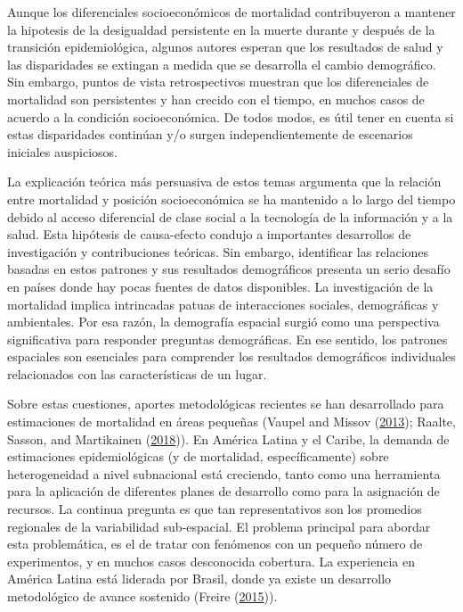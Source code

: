 \documentclass[12pt,]{article}
\begin{document}
Aunque los diferenciales socioeconómicos de mortalidad contribuyeron a
mantener la hipotesis de la desigualdad persistente en la muerte durante
y después de la transición epidemiológica, algunos autores esperan que
los resultados de salud y las disparidades se extingan a medida que se
desarrolla el cambio demográfico. Sin embargo, puntos de vista
retrospectivos muestran que los diferenciales de mortalidad son
persistentes y han crecido con el tiempo, en muchos casos de acuerdo a
la condición socioeconómica. De todos modos, es útil tener en cuenta si
estas disparidades continúan y/o surgen independientemente de escenarios
iniciales auspiciosos.

La explicación teórica más persuasiva de estos temas argumenta que la
relación entre mortalidad y posición socioeconómica se ha mantenido a lo
largo del tiempo debido al acceso diferencial de clase social a la
tecnología de la información y a la salud. Esta hipótesis de
causa-efecto condujo a importantes desarrollos de investigación y
contribuciones teóricas. Sin embargo, identificar las relaciones basadas
en estos patrones y sus resultados demográficos presenta un serio
desafío en países donde hay pocas fuentes de datos disponibles. La
investigación de la mortalidad implica intrincadas patuas de
interacciones sociales, demográficas y ambientales. Por esa razón, la
demografía espacial surgió como una perspectiva significativa para
responder preguntas demográficas. En ese sentido, los patrones
espaciales son esenciales para comprender los resultados demográficos
individuales relacionados con las características de un lugar.

Sobre estas cuestiones, aportes metodológicas recientes se han
desarrollado para estimaciones de mortalidad en áreas pequeñas (Vaupel
and Missov (\protect\hyperlink{ref-Vaupel_Missov_2013}{2013}); Raalte,
Sasson, and Martikainen
(\protect\hyperlink{ref-vanRaalte_Sasson_Martikainen_2018}{2018})). En
América Latina y el Caribe, la demanda de estimaciones epidemiológicas
(y de mortalidad, específicamente) sobre heterogeneidad a nivel
subnacional está creciendo, tanto como una herramienta para la
aplicación de diferentes planes de desarrollo como para la asignación de
recursos. La continua pregunta es que tan representativos son los
promedios regionales de la variabilidad sub-espacial. El problema
principal para abordar esta problemática, es el de tratar con fenómenos
con un pequeño número de experimentos, y en muchos casos desconocida
cobertura. La experiencia en América Latina está liderada por Brasil,
donde ya existe un desarrollo metodológico de avance sostenido (Freire
(\protect\hyperlink{ref-FreireEtAl2015}{2015})).
\end{document}
